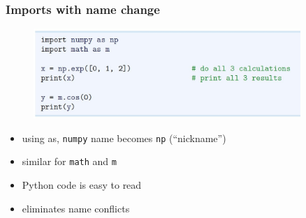 \documentclass[14pt]{beamer}
\newcommand\red[1]{{\color{red} #1}}
\newcommand\green[1]{{\color{green} #1}}
\newcommand{\cmark}{\ding{51}}%
\begin{document}

\begin{frame}[fragile]
\frametitle{Imports with name change}

\begin{figure}[ht]
	\centering
	\includegraphics[width=0.9\textwidth]{figures/LLp18}
\end{figure}
\vspace*{-8mm}
\begin{itemize}
	\item using \red{as}, \texttt{numpy} name becomes \texttt{np} (``nickname'')
	\item similar for \texttt{math} and \texttt{m}
	\item[\green{\cmark}] Python code is easy to read
	\item[\green{\cmark}\green{\cmark}] eliminates name conflicts
\end{itemize}

\end{frame}

\end{document}
